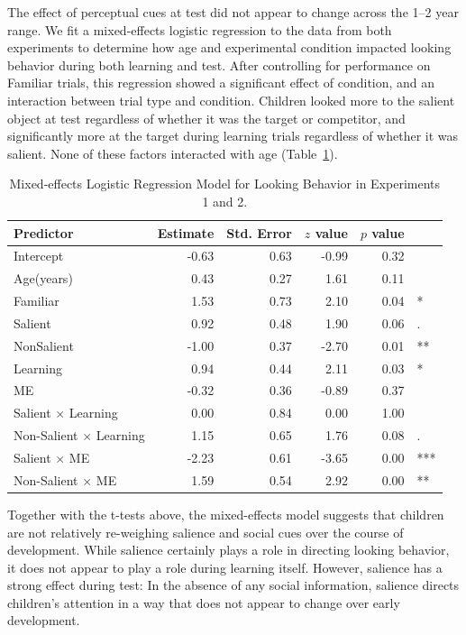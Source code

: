 \documentclass[man,floatsintext]{apa6}
\begin{document}
The effect of perceptual cues at test did not appear to change across the 1--2 year range. We fit a mixed-effects logistic regression to the data from both experiments to determine how age and experimental condition impacted looking behavior during both learning and test. After controlling for performance on Familiar trials, this regression showed a significant effect of condition, and an interaction between trial type and condition. Children looked more to the salient object at test regardless of whether it was the target or competitor, and significantly more at the target during learning trials regardless of whether it was salient. None of these factors interacted with age (Table~\ref{tab:model_table}). 

\begin{table}[!t]
\centering
\caption{Mixed-effects Logistic Regression Model for Looking Behavior in Experiments 1 and 2.} 
\label{tab:model_table}
\begin{tabular}{lrrrrl}
 Predictor & Estimate & Std. Error & $z$ value & $p$ value &  \\ 
  \hline
Intercept & -0.63 & 0.63 & -0.99 & 0.32 &  \\ 
  Age(years) & 0.43 & 0.27 & 1.61 & 0.11 &  \\ 
  Familiar & 1.53 & 0.73 & 2.10 & 0.04 & * \\ 
  Salient & 0.92 & 0.48 & 1.90 & 0.06 & . \\ 
  NonSalient & -1.00 & 0.37 & -2.70 & 0.01 & ** \\ 
  Learning & 0.94 & 0.44 & 2.11 & 0.03 & * \\ 
  ME & -0.32 & 0.36 & -0.89 & 0.37 &  \\ 
  Salient $\times$ Learning & 0.00 & 0.84 & 0.00 & 1.00 &  \\ 
  Non-Salient $\times$ Learning & 1.15 & 0.65 & 1.76 & 0.08 & . \\ 
  Salient $\times$ ME & -2.23 & 0.61 & -3.65 & 0.00 & *** \\ 
  Non-Salient $\times$ ME & 1.59 & 0.54 & 2.92 & 0.00 & ** \\ 
   \hline
\end{tabular}
\end{table}

Together with the t-tests above, the mixed-effects model suggests that children are not relatively re-weighing salience and social cues over the course of development. While salience certainly plays a role in directing looking behavior, it does not appear to play a role during learning itself. However, salience has a strong effect during test: In the absence of any social information, salience directs children's attention in a way that does not appear to change over early development.
\end{document}
